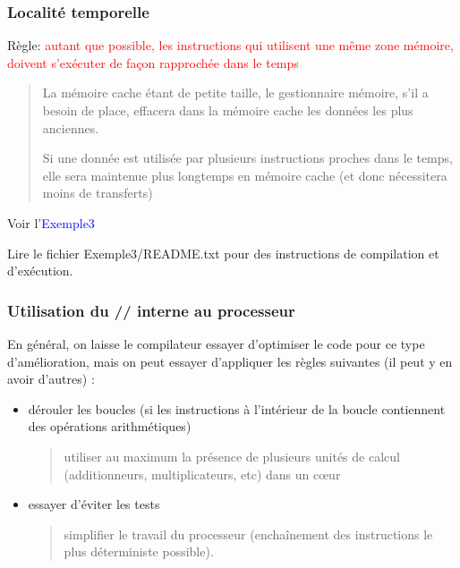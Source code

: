 \documentclass{beamer}
\begin{document}
\begin{frame}
\frametitle{Localit\'e temporelle}
Règle: 
	\textcolor{red}{autant que possible, les instructions qui utilisent une même zone m\'emoire, doivent s'ex\'ecuter de façon rapproch\'ee dans le temps}
	\vfill
	
	\begin{quote}
		La m\'emoire cache \'etant de petite taille, le gestionnaire m\'emoire, s'il a besoin de place, effacera dans la m\'emoire cache les donn\'ees les plus anciennes.
		
		Si une donn\'ee est utilis\'ee par plusieurs instructions proches dans le temps, elle sera maintenue plus longtemps en m\'e\-moi\-re cache (et donc n\'ecessitera moins de transferts)
	\end{quote}

\vfill
Voir l'\textcolor{blue}{Exemple3}

Lire le fichier Exemple3/README.txt pour des instructions de compilation et d'exécution.
\end{frame}

\begin{frame}[fragile]
\frametitle{Utilisation du // interne au processeur}

En général, on laisse le compilateur essayer d'optimiser le code pour ce type d'amélioration, mais on peut essayer d'appliquer les règles suivantes (il peut y en avoir d'autres) :
\vfill
 
\begin{itemize}
	\item dérouler les boucles (si les instructions à l'intérieur de la boucle contiennent des opérations arithmétiques)
	\begin{quote}
		utiliser au maximum la pr\'esence de plusieurs unit\'es de calcul (additionneurs, multiplicateurs, etc) dans un c\oe ur
	\end{quote}
	\item  essayer d'\'eviter les tests
	\begin{quote}
		simplifier le travail du processeur (encha\^{i}nement des instructions le plus d\'eterministe possible).
	\end{quote}
\end{itemize}
\vfill
\end{frame}
\end{document}
